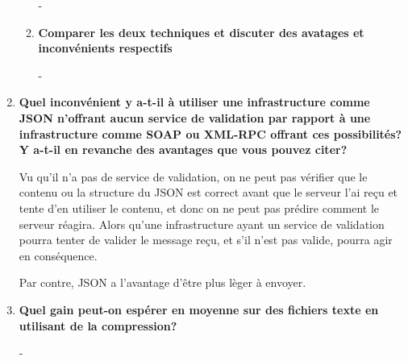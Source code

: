 \documentclass{article}
\begin{document}
\begin{enumerate}
\begin{enumerate}
        -
    
        \item \textbf{Comparer les deux techniques et discuter des avatages et inconvénients respectifs}
    
        -
      \end{enumerate}

    \item \textbf{Quel inconvénient y a-t-il à utiliser une infrastructure comme JSON n'offrant aucun service de validation par rapport à une infrastructure comme SOAP ou XML-RPC offrant ces possibilités? Y a-t-il en revanche des avantages que vous pouvez citer?}
      
      Vu qu'il n'a pas de service de validation, on ne peut pas vérifier que le contenu ou la structure du JSON est correct avant que le serveur l'ai reçu et tente d'en utiliser le contenu, et donc on ne peut pas prédire comment le serveur réagira. Alors qu'une infrastructure ayant un service de validation pourra tenter de valider le message reçu, et s'il n'est pas valide, pourra agir en conséquence.
      
      Par contre, JSON a l'avantage d'être plus lèger à envoyer.

    \item \textbf{Quel gain peut-on espérer en moyenne sur des fichiers texte en utilisant de la compression?}
      
      -

  \end{enumerate}
\end{document}
